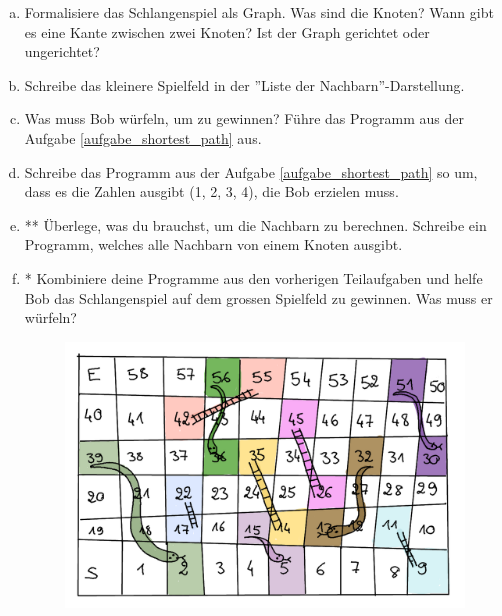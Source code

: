 \begin{aufgabe}\label{aufgabe_schlangenspiel}
\begin{enumerate}[(a)]
    \item Formalisiere das Schlangenspiel als Graph. Was sind die Knoten? Wann gibt es eine Kante zwischen zwei Knoten? Ist der Graph gerichtet oder ungerichtet?
    \item Schreibe das kleinere Spielfeld in der ''Liste der Nachbarn''-Darstellung.
    \item Was muss Bob würfeln, um zu gewinnen? Führe das Programm aus der Aufgabe \ref{aufgabe_shortest_path} aus.
    \item Schreibe das Programm aus der Aufgabe \ref{aufgabe_shortest_path} so um, dass es die Zahlen ausgibt (1, 2, 3, 4), die Bob erzielen muss.
    \item ** Überlege, was du brauchst, um die Nachbarn zu berechnen. Schreibe ein Programm, welches alle Nachbarn von einem Knoten ausgibt.
    \item * Kombiniere deine Programme aus den vorherigen Teilaufgaben und helfe Bob das Schlangenspiel auf dem grossen Spielfeld zu gewinnen. Was muss er würfeln?
    \begin{figure}[H]
    \centering
    \includegraphics[width=\textwidth]{Pictures/SP/snakes_ladders_big.png}
\end{figure}
\end{enumerate}
\end{aufgabe}
